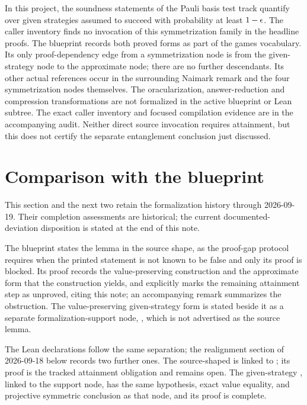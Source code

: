 \documentclass[11pt]{article}
\begin{document}
In this project, the soundness statements of the Pauli basis test track
quantify over given strategies assumed to succeed with probability at least
$1-\epsilon$. The caller inventory finds no invocation of this symmetrization
family in the headline proofs. The blueprint records both proved forms as part
of the games vocabulary. Its only proof-dependency edge from a symmetrization
node is from the given-strategy node to the approximate node; there are no further
descendants. Its other actual references occur in the surrounding Naimark
remark and the four symmetrization nodes themselves. The oracularization,
answer-reduction and compression transformations are not formalized in the
active blueprint or Lean subtree.
The exact caller inventory and focused compilation evidence are in the
accompanying audit. Neither direct source invocation requires attainment, but
this does not certify the separate entanglement conclusion just discussed.

\section{Comparison with the blueprint}

This section and the next two retain the formalization history through 2026-09-19.
Their completion assessments are historical; the current documented-deviation
disposition is stated at the end of this note.

The blueprint \cite{MIPStarREBlueprint} states the lemma in the source shape,
as the proof-gap protocol requires when the printed statement is not known to
be false and only its proof is blocked.  Its proof records the
value-preserving construction and the approximate form that the construction
yields, and explicitly marks the remaining attainment step as unproved, citing
this note; an accompanying remark summarizes the obstruction.  The
value-preserving given-strategy form is stated beside it as a separate
formalization-support node, , which
is not advertised as the source lemma.

The Lean declarations follow the same separation; the realignment section
of 2026-09-18 below records two further ones.  The source-shaped
 is linked to
; its proof is the tracked attainment obligation and
remains open.  The given-strategy
, linked to the
support node, has the same hypothesis, exact value equality, and projective
symmetric conclusion as that node, and its proof is complete.
\end{document}
